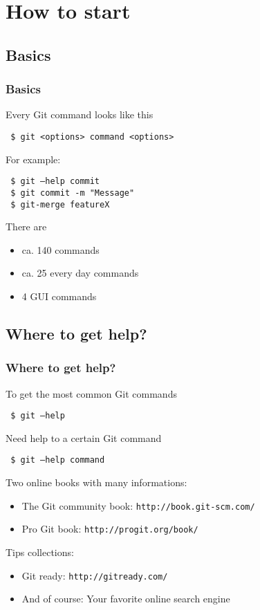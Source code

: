 \documentclass{beamer}
\begin{document}

\section{How to start}
\subsection{Basics}
\begin{frame}
  \frametitle{Basics}
  Every Git command looks like this\medskip
  
  {\tt\ \$ git <options> command <options>}\medskip
  
  \pause
  For example:\medskip
  
  {\tt\ \$ git --help commit}\\
  {\tt\ \$ git commit -m "Message"}\\
  {\tt\ \$ git-merge featureX}\medskip
  
  \pause
  There are
  \begin{itemize}
    \item ca. 140 commands
    \item ca. 25 every day commands
    \item 4 GUI commands
  \end{itemize}   
\end{frame}

\subsection{Where to get help?}
\begin{frame}
    \frametitle{Where to get help?}
    To get the most common Git commands\medskip
    
    {\tt\ \$ git --help}\medskip
   
    \pause
    Need help to a certain Git command\medskip
    
    {\tt\ \$ git --help command}\medskip
    
    \pause
    Two online books with many informations:
    \begin{itemize}
      \item The Git community book: \texttt{http://book.git-scm.com/}
      \item Pro Git book: \texttt{http://progit.org/book/}
    \end{itemize}
    Tips collections:
    \begin{itemize}
      \item Git ready: \texttt{http://gitready.com/}
      \item And of course: Your favorite online search engine
    \end{itemize}
\end{frame}
\end{document}
